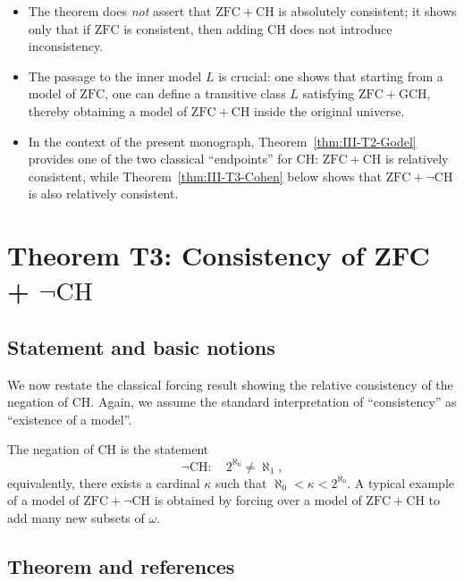 \documentclass[11pt]{book}
\theoremstyle{plain}
\theoremstyle{definition}
\begin{document}
\begin{itemize}
  \item The theorem does \emph{not} assert that
        \(\mathrm{ZFC} + \mathrm{CH}\) is absolutely consistent; it
        shows only that if \(\mathrm{ZFC}\) is consistent, then adding
        CH does not introduce inconsistency.
  \item The passage to the inner model \(L\) is crucial: one shows
        that starting from a model of \(\mathrm{ZFC}\), one can define
        a transitive class \(L\) satisfying \(\mathrm{ZFC}+\mathrm{GCH}\),
        thereby obtaining a model of \(\mathrm{ZFC}+\mathrm{CH}\)
        inside the original universe.
  \item In the context of the present monograph, Theorem~\ref{thm:III-T2-Godel}
        provides one of the two classical “endpoints” for CH:
        \(\mathrm{ZFC}+\mathrm{CH}\) is relatively consistent, while
        Theorem~\ref{thm:III-T3-Cohen} below shows that
        \(\mathrm{ZFC}+\neg\mathrm{CH}\) is also relatively consistent.
\end{itemize}





\section[Theorem T3: Consistency of ZFC + not-CH]{Theorem T3: Consistency of ZFC + $\neg\mathrm{CH}$}
\label{app:III-T3}

\subsection*{Statement and basic notions}


We now restate the classical forcing result showing the relative
consistency of the negation of CH.  Again, we assume the standard
interpretation of “consistency” as “existence of a model”.

The negation of CH is the statement
\[
  \neg\mathrm{CH}:\quad
  2^{\aleph_0} \neq \aleph_1,
\]
equivalently, there exists a cardinal \(\kappa\) such that
\(\aleph_0 < \kappa < 2^{\aleph_0}\).  A typical example of a model of
\(\mathrm{ZFC}+\neg\mathrm{CH}\) is obtained by forcing over a model of
\(\mathrm{ZFC}+\mathrm{CH}\) to add many new subsets of \(\omega\).



\subsection*{Theorem and references}
\end{document}
